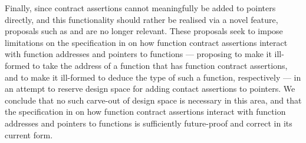 Finally, since contract assertions cannot meaningfully be added to pointers directly, and this functionality should rather be realised via a novel feature, proposals such as \cite{P3221R0} and \cite{P3250R0} are no longer relevant. These proposals seek to impose limitations on the specification in \cite{P2900R7} on how function contract assertions interact with function addresses and pointers to functions --- proposing to make it ill-formed to take the address of a function that has function contract assertions, and to make it ill-formed to deduce the type of such a function, respectively --- in an attempt to reserve design space for adding  contact assertions to pointers. We conclude that no such carve-out of design space is necessary in this area, and that the specification in \cite{P2900R7} on how function contract assertions interact with function addresses and pointers to functions is sufficiently future-proof and correct in its current form.





\renewcommand{\addcontentsline}[3]{}%







